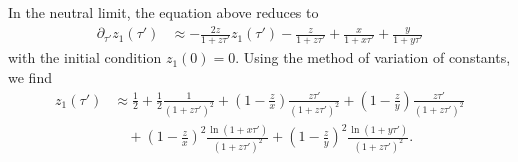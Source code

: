 \documentclass[11pt]{article}
\begin{document}
In the neutral limit, the equation above reduces to
\begin{align}\label{eq:z_neutral_eq}
    \partial_{\tau'}z_1(\tau') &\approx - \frac{2z}{1+z\tau'}z_1(\tau') - \frac{z}{1+z\tau'} + \frac{x}{1+x\tau'} + \frac{y}{1+y\tau'}
\end{align}
with the initial condition $z_1(0)=0$. Using the method of variation of constants, we find
\begin{align}\label{eq:z_1}
    z_1(\tau') &\approx \frac{1}{2} 
    + \frac{1}{2}\frac{1}{(1+z\tau')^2} + \left(1-\frac{z}{x}\right)\frac{z\tau'}{(1+z\tau')^2} + \left(1-\frac{z}{y}\right)\frac{z\tau'}{(1+z\tau')^2}
         \\\nonumber
    &\quad + \left(1-\frac{z}{x}\right)^2 \frac{\ln(1+x\tau')}{(1+z\tau')^2}
    + \left(1-\frac{z}{y}\right)^2 \frac{\ln(1+y\tau')}{(1+z\tau')^2}.
\end{align}
\end{document}
